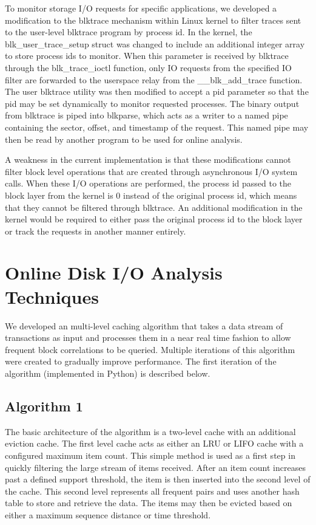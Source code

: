 \documentclass[MEng]{uofl}
\begin{document}
To monitor storage I/O requests for specific applications, we developed a modification to the blktrace mechanism within Linux kernel to filter traces sent to the user-level blktrace program by process id. 
In the kernel, the blk\_user\_trace\_setup struct was changed to include an additional integer array to store process ids to monitor. 
When this parameter is received by blktrace through the blk\_trace\_ioctl function, only IO requests from the specified IO filter are forwarded to the userspace relay from the \_\_blk\_add\_trace function. 
The user blktrace utility was then modified to accept a pid parameter so that the pid may be set dynamically to monitor requested processes. The binary output from blktrace is piped into blkparse, which acts as a writer to a named pipe containing the sector, offset, and timestamp of the request. This named pipe may then be read by another program to be used for online analysis. 

A weakness in the current implementation is that these modifications cannot filter block level operations that are created through asynchronous I/O system calls. When these I/O operations are performed, the process id passed to the block layer from the kernel is 0 instead of the original process id, which means that they cannot be filtered through blktrace. An additional modification in the kernel would be required to either pass the original process id to the block layer or track the requests in another manner entirely. 

\section{Online Disk I/O Analysis Techniques}
We developed an multi-level caching algorithm that takes a data stream of transactions as input and processes them in a near real time fashion to allow frequent block correlations to be queried. Multiple iterations of this algorithm were created to gradually improve performance. The first iteration of the algorithm (implemented in Python) is described below. 

\subsection{Algorithm 1}
The basic architecture of the algorithm is a two-level cache with an additional eviction cache. The first level cache acts as either an LRU or LIFO cache with a configured maximum item count. This simple method is used as a first step in quickly filtering the large stream of items received. After an item count increases past a defined support threshold, the item is then inserted into the second level of the cache. This second level represents all frequent pairs and uses another hash table to store and retrieve the data. The items may then be evicted based on either a maximum sequence distance or time threshold. 
\end{document}
